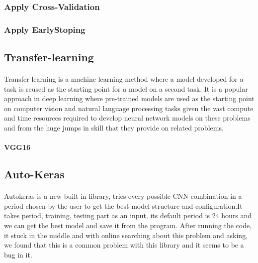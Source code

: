 \subsubsection{Apply Cross-Validation}
\subsubsection{Apply EarlyStoping}
\subsection{Transfer-learning}
\paragraph{}
Transfer learning is a machine learning method where a model developed for a task is reused as the starting point for a model on a second task.
It is a popular approach in deep learning where pre-trained models are used as the starting point on computer vision and natural language processing tasks given the vast compute and time resources required to develop neural network models on these problems and from the huge jumps in skill that they provide on related problems.
\paragraph{VGG16}
\subsection{Auto-Keras}
\paragraph{}
Autokeras is a new built-in library, tries every possible CNN combination in a period chosen by the user to get the best model structure and configuration.It takes period, training, testing part as an input, its default period is 24 hours and we can get the best model and save it from the program.
After running the code, it stuck in the middle and with online searching about this problem and asking, we found that this is a common problem with this library and it seems to be a bug in it.

